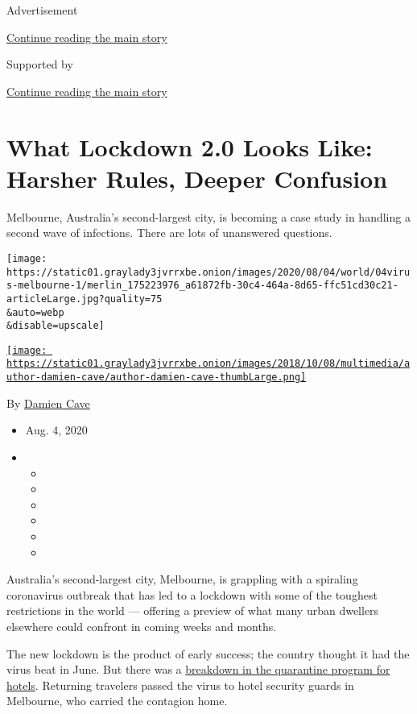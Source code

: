 Advertisement

\protect\hyperlink{after-top}{Continue reading the main story}

Supported by

\protect\hyperlink{after-sponsor}{Continue reading the main story}

\hypertarget{what-lockdown-20-looks-like-harsher-rules-deeper-confusion}{%
\section{What Lockdown 2.0 Looks Like: Harsher Rules, Deeper
Confusion}\label{what-lockdown-20-looks-like-harsher-rules-deeper-confusion}}

Melbourne, Australia's second-largest city, is becoming a case study in
handling a second wave of infections. There are lots of unanswered
questions.

\texttt{[image: https://static01.graylady3jvrrxbe.onion/images/2020/08/04/world/04virus-melbourne-1/merlin\_175223976\_a61872fb-30c4-464a-8d65-ffc51cd30c21-articleLarge.jpg?quality=75\\\&auto=webp\\\&disable=upscale]}

\href{https://www.nytimes3xbfgragh.onion/by/damien-cave}{\texttt{[image: https://static01.graylady3jvrrxbe.onion/images/2018/10/08/multimedia/author-damien-cave/author-damien-cave-thumbLarge.png]}}

By \href{https://www.nytimes3xbfgragh.onion/by/damien-cave}{Damien Cave}

\begin{itemize}
\item
  Aug. 4, 2020
\item
  \begin{itemize}
  \item
  \item
  \item
  \item
  \item
  \item
  \end{itemize}
\end{itemize}

Australia's second-largest city, Melbourne, is grappling with a
spiraling coronavirus outbreak that has led to a lockdown with some of
the toughest restrictions in the world --- offering a preview of what
many urban dwellers elsewhere could confront in coming weeks and months.

The new lockdown is the product of early success; the country thought it
had the virus beat in June. But there was a
\href{https://www.theage.com.au/national/victoria/how-hotel-quarantine-let-covid-19-out-of-the-bag-in-victoria-20200703-p558og.html}{breakdown
in the quarantine program for hotels}. Returning travelers passed the
virus to hotel security guards in Melbourne, who carried the contagion
home.


